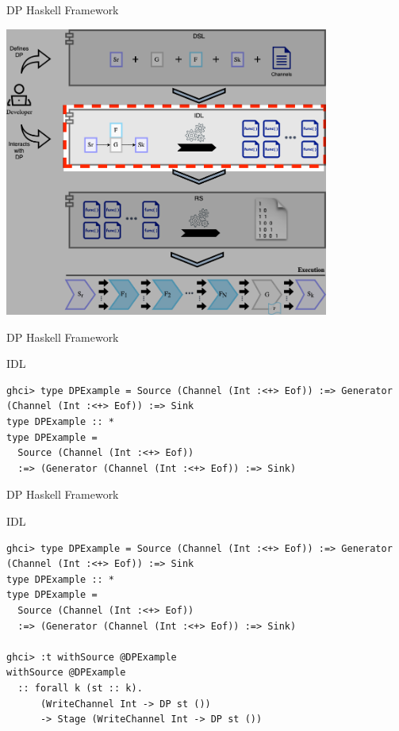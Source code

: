 \documentclass{beamer}
\begin{document}
  \begin{frame}[fragile]{DP Haskell Framework}
    \begin{center}
      \includegraphics[width = 0.8\textwidth, height = 0.8\textheight]{dpf_haskell_v3-2}
    \end{center}
  \end{frame}

  \begin{frame}[fragile]{DP Haskell Framework}
    \begin{block}{IDL}
      \begin{verbatim}      
ghci> type DPExample = Source (Channel (Int :<+> Eof)) :=> Generator (Channel (Int :<+> Eof)) :=> Sink
type DPExample :: *
type DPExample =
  Source (Channel (Int :<+> Eof))
  :=> (Generator (Channel (Int :<+> Eof)) :=> Sink)
    \end{verbatim}
  \end{block}
  \end{frame}

  \begin{frame}[fragile]{DP Haskell Framework}
    \begin{block}{IDL}
      \begin{verbatim}      
ghci> type DPExample = Source (Channel (Int :<+> Eof)) :=> Generator (Channel (Int :<+> Eof)) :=> Sink
type DPExample :: *
type DPExample =
  Source (Channel (Int :<+> Eof))
  :=> (Generator (Channel (Int :<+> Eof)) :=> Sink)
        
ghci> :t withSource @DPExample
withSource @DPExample
  :: forall k (st :: k).
      (WriteChannel Int -> DP st ())
      -> Stage (WriteChannel Int -> DP st ())
    \end{verbatim}
  \end{block}
  \end{frame}
\end{document}
